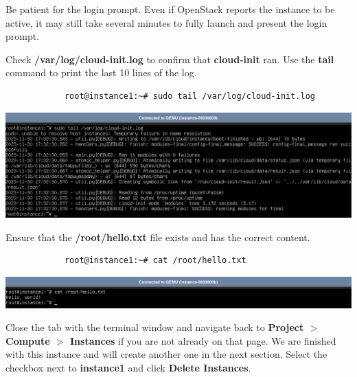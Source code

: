 \documentclass[letterpaper, 12pt]{article}
\begin{document}
\begin{enumerate}
    \begin{notebox}
        Be patient for the login prompt.
        Even if OpenStack reports the instance to be active, it may still take several minutes to fully launch and present the login prompt.
    \end{notebox}

    \begin{labstep}
        Check \textbf{/var/log/cloud-init.log} to confirm that \textbf{cloud-init} ran.
        Use the \textbf{tail} command to print the last 10 lines of the log.
        \begin{lstlisting}
            root@instance1:~# sudo tail /var/log/cloud-init.log
        \end{lstlisting}

        \begin{center}
            \includegraphics[width=\linewidth]{images/part2/step14.png}
        \end{center}
    \end{labstep}

    \begin{labstep}
        Ensure that the \textbf{/root/hello.txt} file exists and has the correct content.
        \begin{lstlisting}
            root@instance1:~# cat /root/hello.txt
        \end{lstlisting}

        \begin{center}
            \includegraphics[width=\linewidth]{images/part2/step15.png}
        \end{center}
    \end{labstep}

    \begin{labstep}
        Close the tab with the terminal window and navigate back to \textbf{Project $>$ Compute $>$ Instances} if you are not already on that page.
        We are finished with this instance and will create another one in the next section.
        Select the checkbox next to \textbf{instance1} and click \textbf{Delete Instances}.


\end{labstep}
\end{enumerate}
\end{document}
